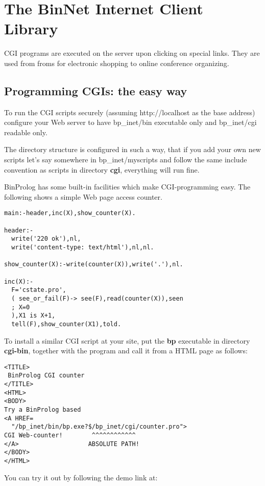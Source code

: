 \documentclass{article}
\begin{document}
\section{The BinNet Internet Client Library}

CGI programs are executed on the server upon
clicking on special links. They are used from froms for electronic shopping
to online conference organizing.

\subsection{Programming CGIs: the easy way}

To run the CGI scripts securely (assuming http://localhost as the base address)
configure your Web server to have bp\_inet/bin executable only and bp\_inet/cgi
readable only.

The directory structure is configured in such a way, that if you add
your own new scripts let's say somewhere in bp\_inet/myscripts and follow
the same include convention as scripts in directory {\bf cgi}, everything
will run fine.

BinProlog  has some built-in facilities which make CGI-programming
easy. The following shows a simple Web page access counter.

{\small \begin{verbatim}
main:-header,inc(X),show_counter(X).

header:-
  write('220 ok'),nl,
  write('content-type: text/html'),nl,nl.

show_counter(X):-write(counter(X)),write('.'),nl.

inc(X):-
  F='cstate.pro',
  ( see_or_fail(F)-> see(F),read(counter(X)),seen
  ; X=0
  ),X1 is X+1,
  tell(F),show_counter(X1),told.
\end{verbatim}}

To install a similar CGI script at your site, put the {\bf bp} executable
in directory {\bf cgi-bin}, together with the program and call it from
a HTML page as follows:

{\small
\begin{verbatim}
<TITLE>
 BinProlog CGI counter
</TITLE>
<HTML>
<BODY>
Try a BinProlog based
<A HREF=
  "/bp_inet/bin/bp.exe?$/bp_inet/cgi/counter.pro">
CGI Web-counter!        ^^^^^^^^^^^^ 
</A>                   ABSOLUTE PATH!
</BODY>
</HTML>
\end{verbatim}
}

You can try it out by following the demo link at:
\end{document}
